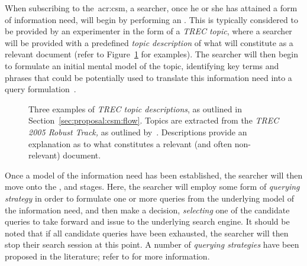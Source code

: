 When subscribing to the~\gls{acr:csm}, a searcher, once he or she has attained a form of information need, will begin by performing an . This is typically considered to be provided by an experimenter in the form of a \emph{TREC topic}, where a searcher will be provided with a predefined \emph{topic description} of what will constitute as a relevant document (refer to Figure~\ref{fig:topics} for examples). The searcher will then begin to formulate an initial mental model of the topic, identifying key terms and phrases that could be potentially used to translate this information need into a query formulation~\citep{borlund2003iir_model}.

\begin{figure}[t!]
    \centering
    \caption[Examples of TREC Topics]{Three examples of \emph{TREC topic descriptions}, as outlined in Section~\ref{sec:proposal:csm:flow}. Topics are extracted from the \emph{TREC 2005 Robust Track,} as outlined by~\cite{voorhees2006trec_robust}. Descriptions provide an explanation as to what constitutes a relevant (and often non-relevant) document.}
    \label{fig:topics}
\end{figure}

Once a model of the information need has been established, the searcher will then move onto the ,  and  stages. Here, the searcher will employ some form of \emph{querying strategy} in order to formulate one or more queries from the underlying model of the information need, and then make a decision, \emph{selecting} one of the candidate queries to take forward and issue to the underlying search engine. It should be noted that if all candidate queries have been exhausted, the searcher will then stop their search session at this point. A number of \emph{querying strategies} have been proposed in the literature; refer to  for more information.

